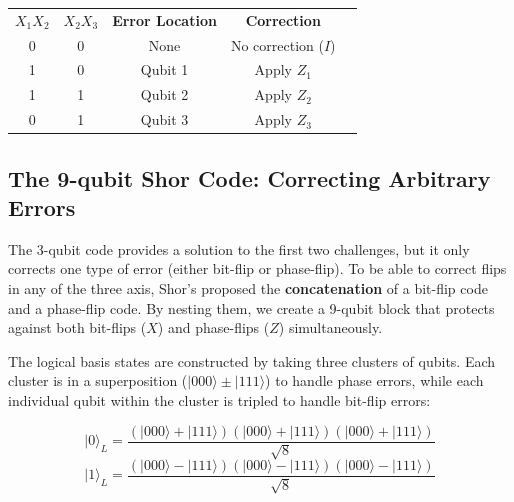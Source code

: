 \begin{table}[H]
    \centering
    \small
    \renewcommand{\arraystretch}{1.2} 
    \begin{tabular}{@{}ccccl@{}}
        \hline
        \textbf{$X_1 X_2$} & \textbf{$X_2 X_3$} & \textbf{Error Location} & \textbf{Correction} \\
        0 & 0 & None & No correction ($I$) \\
        1 & 0 & Qubit 1 & Apply $Z_1$ \\
        1 & 1 & Qubit 2 & Apply $Z_2$ \\
        0 & 1 & Qubit 3 & Apply $Z_3$ \\ \hline
    \end{tabular}
    \label{tab:3-qubit-z-syndrome}
\end{table}

\subsection*{The 9-qubit Shor Code: Correcting Arbitrary Errors}
The 3-qubit code provides a solution to the first two challenges, but it only corrects one type of error (either bit-flip or phase-flip). To be able to correct flips in any of the three axis, Shor's proposed the \textbf{concatenation} of a bit-flip code and a phase-flip code. By nesting them, we create a 9-qubit block that protects against both bit-flips ($X$) and phase-flips ($Z$) simultaneously. 

The logical basis states are constructed by taking three clusters of qubits. Each cluster is in a superposition ($|000\rangle \pm |111\rangle$) to handle phase errors, while each individual qubit within the cluster is tripled to handle bit-flip errors:

$$|0\rangle_L = \frac{(|000\rangle + |111\rangle)(|000\rangle + |111\rangle)(|000\rangle + |111\rangle)}{\sqrt{8}}$$
$$|1\rangle_L = \frac{(|000\rangle - |111\rangle)(|000\rangle - |111\rangle)(|000\rangle - |111\rangle)}{\sqrt{8}}$$

